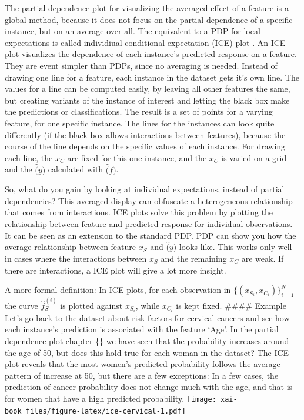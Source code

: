 \documentclass[12pt,]{krantz}
\theoremstyle{definition}
\theoremstyle{definition}
\theoremstyle{definition}
\theoremstyle{remark}
\begin{document}
The partial dependence plot for visualizing the averaged effect of a
feature is a global method, because it does not focus on the partial
dependence of a specific instance, but on an average over all. The
equivalent to a PDP for local expectations is called individiual
conditional expectation (ICE) plot \citep{goldstein2015peeking}. An ICE
plot visualizes the dependence of each instance's predicted response on
a feature. They are event simpler than PDPs, since no averaging is
needed. Instead of drawing one line for a feature, each instance in the
dataset gets it's own line. The values for a line can be computed
easily, by leaving all other features the same, but creating variants of
the instance of interest and letting the black box make the predictions
or classifications. The result is a set of points for a varying feature,
for one specific instance. The lines for the instances can look quite
differently (if the black box allows interactions between features),
because the course of the line depends on the specific values of each
instance. For drawing each line, the \(x_C\) are fixed for this one
instance, and the \(x_C\) is varied on a grid and the \(\hat(y)\)
calculated with \(\hat(f)\).

So, what do you gain by looking at individual expectations, instead of
partial dependencies? This averaged display can obfuscate a
heterogeneous relationship that comes from interactions. ICE plots
\citep{goldstein2015peeking} solve this problem by plotting the
relationship between feature and predicted response for individual
observations. It can be seen as an extension to the standard PDP. PDP
can show you how the average relationship between feature \(x_S\) and
\(\hat(y)\) looks like. This works only well in cases where the
interactions between \(x_S\) and the remaining \(x_C\) are weak. If
there are interactions, a ICE plot will give a lot more insight.

A more formal definition: In ICE plots, for each observation in
\(\{(x_{S_i}, x_{C_i})\}_{i=1}^N\) the curve \(\hat{f}_S^{(i)}\) is
plotted against \(x_{S_i}\), while \(x_{C_i}\) is kept fixed. \#\#\#\#
Example Let's go back to the dataset about risk factors for cervical
cancers and see how each instance's prediction is associated with the
feature `Age'. In the partial dependence plot chapter \{\citet{pdp}\} we
have seen that the probability increases around the age of 50, but does
this hold true for each woman in the dataset? The ICE plot reveals that
the most women's predicted probability follows the average pattern of
increase at 50, but there are a few exceptions: In a few cases, the
prediction of cancer probability does not change much with the age, and
that is for women that have a high predicted probability.
\texttt{[image: xai-book\_files/figure-latex/ice-cervical-1.pdf]}
\end{document}
